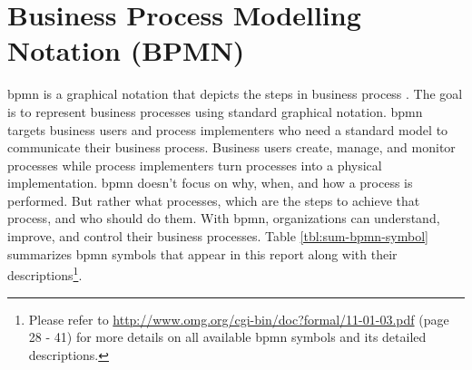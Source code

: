 \section{Business Process Modelling Notation (BPMN)}
\gls{bpmn} is a graphical notation that depicts the steps in business process \cite{bpmn_omg}.
The goal is to represent business processes using standard graphical notation.
\gls{bpmn} targets business users and process implementers who need a standard model to communicate their business process.
Business users create, manage, and monitor processes while process implementers turn processes into a physical implementation. 
\gls{bpmn} doesn't focus on why, when, and how a process is performed.
But rather what processes, which are the steps to achieve that process, and who should do them.
With \gls{bpmn}, organizations can understand, improve, and control their business processes.
Table \ref{tbl:sum-bpmn-symbol} summarizes \gls{bpmn} symbols that appear in this report along with their descriptions\footnote{Please refer to \url{http://www.omg.org/cgi-bin/doc?formal/11-01-03.pdf} (page 28 - 41) for more details on all available \gls{bpmn} symbols and its detailed descriptions.}.
